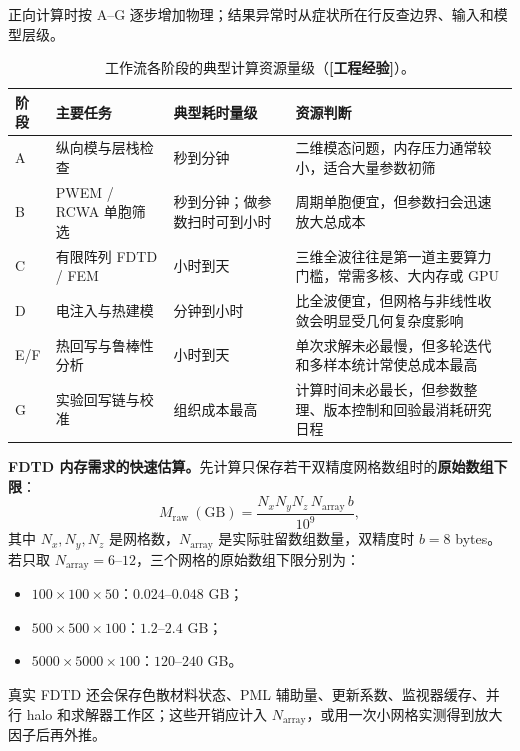 正向计算时按 A--G 逐步增加物理；结果异常时从症状所在行反查边界、输入和模型层级。

\begin{table}[htbp]
  \centering
  \footnotesize
  \caption{工作流各阶段的典型计算资源量级（\textbf{[工程经验]}）。}
  \label{tab:workflow_resource_budget}
  \begin{tabularx}{\textwidth}{@{}p{1.1cm}p{3.3cm}p{2.6cm}Y@{}}
    \toprule
    阶段 & 主要任务 & 典型耗时量级 & 资源判断 \\ \midrule
    A & 纵向模与层栈检查 & 秒到分钟 & 二维模态问题，内存压力通常较小，适合大量参数初筛 \\
    B & PWEM / RCWA 单胞筛选 & 秒到分钟；做参数扫时可到小时 & 周期单胞便宜，但参数扫会迅速放大总成本 \\
    C & 有限阵列 FDTD / FEM & 小时到天 & 三维全波往往是第一道主要算力门槛，常需多核、大内存或 GPU \\
    D & 电注入与热建模 & 分钟到小时 & 比全波便宜，但网格与非线性收敛会明显受几何复杂度影响 \\
    E/F & 热回写与鲁棒性分析 & 小时到天 & 单次求解未必最慢，但多轮迭代和多样本统计常使总成本最高 \\
    G & 实验回写链与校准 & 组织成本最高 & 计算时间未必最长，但参数整理、版本控制和回验最消耗研究日程 \\
    \bottomrule
  \end{tabularx}
\end{table}
\begin{notebox}
\textbf{FDTD 内存需求的快速估算。}先计算只保存若干双精度网格数组时的\textbf{原始数组下限}：
\[
M_{\mathrm{raw}}\ (\mathrm{GB})
=
\frac{N_x N_y N_z\,N_{\mathrm{array}}\,b}{10^9},
\]
其中 $N_x,N_y,N_z$ 是网格数，$N_{\mathrm{array}}$ 是实际驻留数组数量，双精度时 $b=8$ bytes。若只取 $N_{\mathrm{array}}=6$--$12$，三个网格的原始数组下限分别为：
\begin{itemize}
  \item $100\times100\times50$：$0.024$--$0.048$ GB；
  \item $500\times500\times100$：$1.2$--$2.4$ GB；
  \item $5000\times5000\times100$：$120$--$240$ GB。
\end{itemize}
真实 FDTD 还会保存色散材料状态、PML 辅助量、更新系数、监视器缓存、并行 halo 和求解器工作区；这些开销应计入 $N_{\mathrm{array}}$，或用一次小网格实测得到放大因子后再外推。
\end{notebox}
